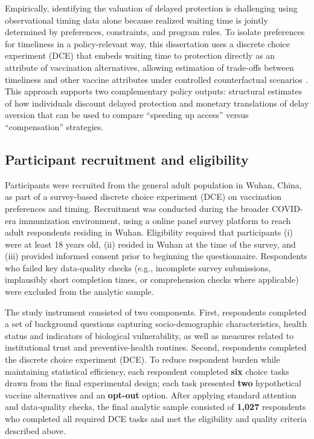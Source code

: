 \documentclass[doublespacing]{utdthesis}
\begin{document}
Empirically, identifying the valuation of delayed protection is challenging using observational timing data alone because realized waiting time is jointly determined by preferences, constraints, and program rules. To isolate preferences for timeliness in a policy-relevant way, this dissertation uses a discrete choice experiment (DCE) that embeds waiting time to protection directly as an attribute of vaccination alternatives, allowing estimation of trade-offs between timeliness and other vaccine attributes under controlled counterfactual scenarios \citep{Louviere2000, Train2009, DCEreview2025}. This approach supports two complementary policy outputs: structural estimates of how individuals discount delayed protection and monetary translations of delay aversion that can be used to compare ``speeding up access'' versus ``compensation'' strategies.


\subsection{Participant recruitment and eligibility}
Participants were recruited from the general adult population in Wuhan, China, as part of a survey-based discrete choice experiment (DCE) on vaccination preferences and timing. Recruitment was conducted during the broader COVID-era immunization environment, using a online panel survey platform to reach adult respondents residing in Wuhan. Eligibility required that participants (i) were at least 18 years old, (ii) resided in Wuhan at the time of the survey, and (iii) provided informed consent prior to beginning the questionnaire. Respondents who failed key data-quality checks (e.g., incomplete survey submissions, implausibly short completion times, or comprehension checks where applicable) were excluded from the analytic sample.

The study instrument consisted of two components. First, respondents completed a set of background questions capturing socio-demographic characteristics, health status and indicators of biological vulnerability, as well as measures related to institutional trust and preventive-health routines. Second, respondents completed the discrete choice experiment (DCE). To reduce respondent burden while maintaining statistical efficiency, each respondent completed \textbf{six} choice tasks drawn from the final experimental design; each task presented \textbf{two} hypothetical vaccine alternatives and an \textbf{opt-out} option. After applying standard attention and data-quality checks, the final analytic sample consisted of \textbf{1{,}027} respondents who completed all required DCE tasks and met the eligibility and quality criteria described above.
\end{document}
